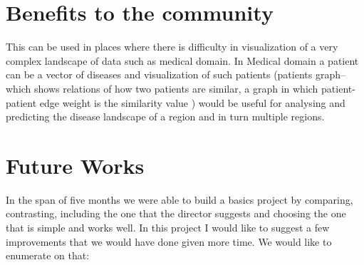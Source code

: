 \section{Benefits to the community}
This can be used in places where there is difficulty in visualization of a very complex landscape
of data such as medical domain. In Medical domain a patient can be a vector of diseases and
visualization of such patients (patients graph–which shows relations of how two patients are
similar, a graph in which patient-patient edge weight is the similarity value ) would be useful for
analysing and predicting the disease landscape of a region and in turn multiple regions.


\section{Future Works}
In the span of five months we were able to build a basics project by comparing, contrasting, including the one that the director suggests and choosing the one that is simple and works well. In this project I would like to suggest a few improvements that we would have done given more time. We would like to enumerate on that:

